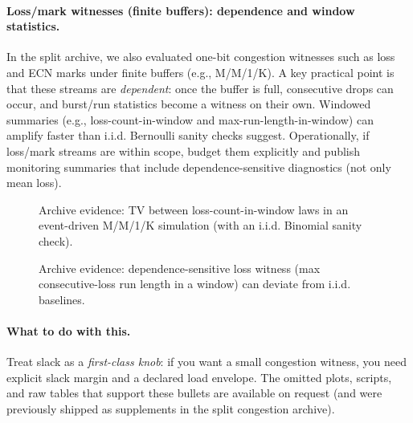 \documentclass[11pt]{article}
\theoremstyle{definition}
\theoremstyle{remark}
\begin{document}
\paragraph{Loss/mark witnesses (finite buffers): dependence and window statistics.}
In the split archive, we also evaluated one-bit congestion witnesses such as loss and ECN marks under finite buffers (e.g., M/M/1/K).
A key practical point is that these streams are \emph{dependent}: once the buffer is full, consecutive drops can occur, and burst/run statistics become a witness on their own.
Windowed summaries (e.g., loss-count-in-window and max-run-length-in-window) can amplify faster than i.i.d. Bernoulli sanity checks suggest.
Operationally, if loss/mark streams are within scope, budget them explicitly and publish monitoring summaries that include dependence-sensitive diagnostics (not only mean loss).


\begin{figure}[t]
\centering
{}
\caption{Archive evidence: TV between loss-count-in-window laws in an event-driven M/M/1/K simulation (with an i.i.d. Binomial sanity check).}
\label{fig:mm1kwindow}
\end{figure}

\begin{figure}[t]
\centering
{}
\caption{Archive evidence: dependence-sensitive loss witness (max consecutive-loss run length in a window) can deviate from i.i.d. baselines.}
\label{fig:mm1krun}
\end{figure}

\paragraph{What to do with this.}
Treat slack as a \emph{first-class knob}: if you want a small congestion witness, you need explicit slack margin and a declared load envelope.
The omitted plots, scripts, and raw tables that support these bullets are available on request (and were previously shipped as supplements in the split congestion archive).
\end{document}
